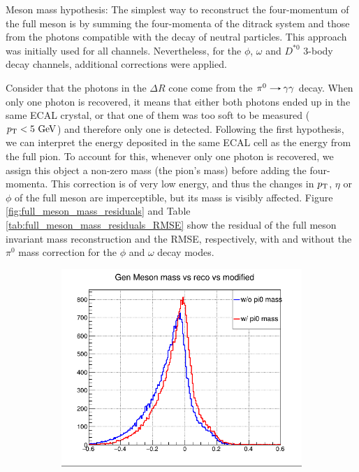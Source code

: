 \begin{myitemlist}
    \item[Meson mass hypothesis:] The simplest way to reconstruct the four-momentum of the full meson is by summing the four-momenta of the ditrack system and those from the photons compatible with the decay of neutral particles. This approach was initially used for all channels. Nevertheless, for the $\phi$, $\omega$ and $D^{*0}$ 3-body decay channels, additional corrections were applied.
    
    Consider that the photons in the $\Delta R$ cone come from the $\pi^{0}\decaysto\gamma\gamma$ decay. When only one photon is recovered, it means that either both photons ended up in the same ECAL crystal, or that one of them was too soft to be measured ($p_\text{T} < 5\ \text{GeV}$) and therefore only one is detected. Following the first hypothesis, we can interpret the energy deposited in the same ECAL cell as the energy from the full pion. To account for this, whenever only one photon is recovered, we assign this object a non-zero mass (the pion's mass) before adding the four-momenta. This correction is of very low energy, and thus the changes in $p_\text{T}$, $\eta$ or $\phi$ of the full meson are imperceptible, but its mass is visibly affected. Figure \ref{fig:full_meson_mass_residuals} and Table \ref{tab:full_meson_mass_residuals_RMSE} show the residual of the full meson invariant mass reconstruction and the RMSE, respectively, with and without the $\pi^0$ mass correction for the $\phi$ and $\omega$ decay modes.
    \begin{figure}[!ht]
        \captionsetup[subfigure]{labelformat=empty}
        \vspace*{-0.2cm}
        \centering
        \setlength{\mylength}{\textwidth}
        \begin{subfigure}[t]{0.50\mylength}
                \centering
                \includegraphics[width=0.45\mylength]{resources/plots/Phi3_fullmeson_mass_residual.png}

\end{subfigure}
\end{figure}
\end{myitemlist}

